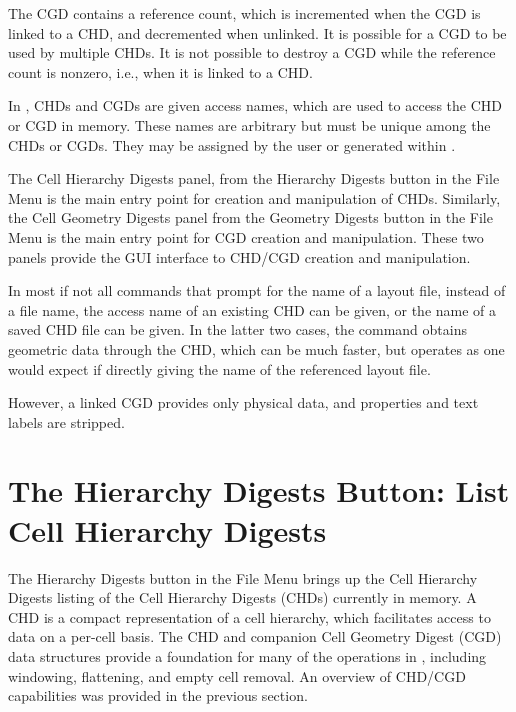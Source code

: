 The CGD contains a reference count, which is incremented when the CGD
is linked to a CHD, and decremented when unlinked.  It is possible for
a CGD to be used by multiple CHDs.  It is not possible to destroy a
CGD while the reference count is nonzero, i.e., when it is linked to a
CHD.

In {\Xic}, CHDs and CGDs are given access names, which are used to
access the CHD or CGD in memory.  These names are arbitrary but must
be unique among the CHDs or CGDs.  They may be assigned by the user or
generated within {\Xic}.

The {\cb Cell Hierarchy Digests} panel, from the {\cb Hierarchy
Digests} button in the {\cb File Menu} is the main entry point for
creation and manipulation of CHDs.  Similarly, the {\cb Cell Geometry
Digests} panel from the {\cb Geometry Digests} button in the {\cb File
Menu} is the main entry point for CGD creation and manipulation. 
These two panels provide the GUI interface to CHD/CGD creation and
manipulation.

In most if not all {\Xic} commands that prompt for the name of a
layout file, instead of a file name, the access name of an existing
CHD can be given, or the name of a saved CHD file can be given.  In
the latter two cases, the command obtains geometric data through the
CHD, which can be much faster, but operates as one would expect if
directly giving the name of the referenced layout file.

However, a linked CGD provides only physical data, and properties and
text labels are stripped.


\section{The {\cb Hierarchy Digests} Button: List {\cb Cell Hierarchy Digests}}

The {\cb Hierarchy Digests} button in the {\cb File Menu} brings up the
{\cb Cell Hierarchy Digests} listing of the Cell Hierarchy Digests
(CHDs) currently in memory.  A CHD is a compact representation of a
cell hierarchy, which facilitates access to data on a per-cell basis. 
The CHD and companion Cell Geometry Digest (CGD) data structures
provide a foundation for many of the operations in {\Xic}, including
windowing, flattening, and empty cell removal.  An overview of CHD/CGD
capabilities was provided in the previous section.

